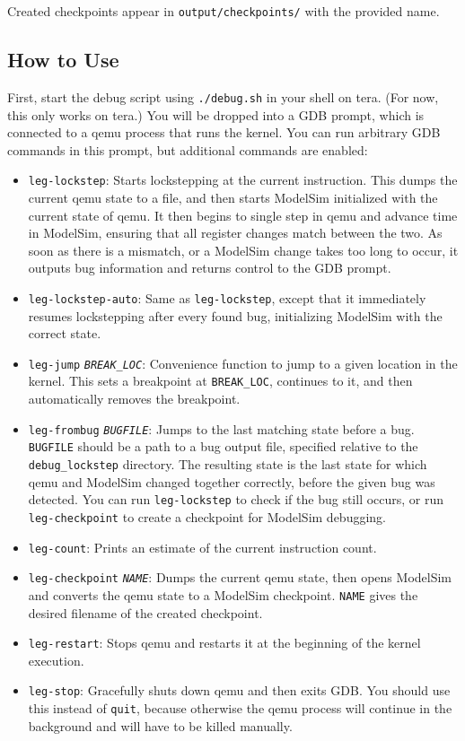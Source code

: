 Created checkpoints appear in \texttt{output/checkpoints/} with the provided name.

\subsection{How to Use}
First, start the debug script using \texttt{./debug.sh} in your shell on tera. (For now, this only works on tera.) You will be dropped into a GDB prompt, which is connected to a qemu process that runs the kernel. You can run arbitrary GDB commands in this prompt, but additional commands are enabled:

\begin{itemize}
\item \texttt{leg-lockstep}: Starts lockstepping at the current instruction. This dumps the current qemu state to a file, and then starts ModelSim initialized with the current state of qemu. It then begins to single step in qemu and advance time in ModelSim, ensuring that all register changes match between the two. As soon as there is a mismatch, or a ModelSim change takes too long to occur, it outputs bug information and returns control to the GDB prompt.
\item \texttt{leg-lockstep-auto}: Same as \texttt{leg-lockstep}, except that it immediately resumes lockstepping after every found bug, initializing ModelSim with the correct state.
\item \texttt{leg-jump} \texttt{\emph{BREAK\_LOC}}: Convenience function to jump to a given location in the kernel. This sets a breakpoint at \texttt{BREAK\_LOC}, continues to it, and then automatically removes the breakpoint.
\item \texttt{leg-frombug} \texttt{\emph{BUGFILE}}: Jumps to the last matching state before a bug. \texttt{BUGFILE} should be a path to a bug output file, specified relative to the \texttt{debug_lockstep} directory. The resulting state is the last state for which qemu and ModelSim changed together correctly, before the given bug was detected. You can run \texttt{leg-lockstep} to check if the bug still occurs, or run \texttt{leg-checkpoint} to create a checkpoint for ModelSim debugging.
\item \texttt{leg-count}: Prints an estimate of the current instruction count.
\item \texttt{leg-checkpoint} \texttt{\emph{NAME}}: Dumps the current qemu state, then opens ModelSim and converts the qemu state to a ModelSim checkpoint. \texttt{NAME} gives the desired filename of the created checkpoint.
\item \texttt{leg-restart}: Stops qemu and restarts it at the beginning of the kernel execution.
\item \texttt{leg-stop}: Gracefully shuts down qemu and then exits GDB. You should use this instead of \texttt{quit}, because otherwise the qemu process will continue in the background and will have to be killed manually.
\end{itemize}